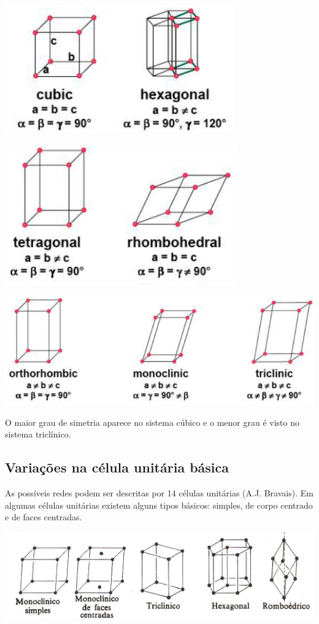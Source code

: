 \includegraphics[scale=0.5,trim={0 0 0 0}]{figures/crist1}

\includegraphics[scale=0.5,trim={0 0 0 0}]{figures/crist2}

\includegraphics[scale=0.3,trim={0 0 0 0}]{figures/crist3}


O maior grau de simetria aparece no sistema cúbico e o menor grau é visto no sistema triclínico.

\subsection*{Variações na célula unitária básica}

As possíveis redes podem ser descritas por 14 células unitárias (A.J. Bravais).
Em algumas células unitárias existem alguns tipos básicos: simples, de corpo centrado e de faces centradas.
 
 \includegraphics[scale=0.4,trim={0 0 0 0}]{figures/var1}
 
